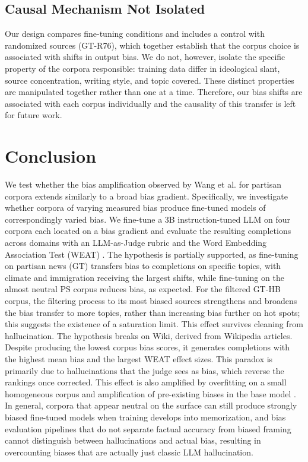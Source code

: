 \documentclass[12pt]{article}
\begin{document}
\subsection{Causal Mechanism Not Isolated}
Our design compares fine-tuning conditions and includes a control with randomized sources (GT-R76), which together establish that the corpus choice is associated with shifts in output bias. 
We do not, however, isolate the specific property of the corpora responsible: training data differ in ideological slant, source concentration, writing style, and topic covered. 
These distinct properties are manipulated together rather than one at a time.
Therefore, our bias shifts are associated with each corpus individually and the causality of this transfer is left for future work.
 
\section{Conclusion}
We test whether the bias amplification observed by Wang et al. \cite{wang2024bias} for partisan corpora extends similarly to a broad bias gradient. 
Specifically, we investigate whether corpora of varying measured bias produce fine-tuned models of correspondingly varied bias. 
We fine-tune a 3B instruction-tuned LLM on four corpora each located on a bias gradient and evaluate the resulting completions across domains with an LLM-as-Judge rubric and the Word Embedding Association Test (WEAT) \cite{caliskan2017}. 
The hypothesis is partially supported, as fine-tuning on partisan news (GT) transfers bias to completions on specific topics, with climate and immigration receiving the largest shifts, while fine-tuning on the almost neutral PS corpus reduces bias, as expected.
For the filtered GT-HB corpus, the filtering process to its most biased sources strengthens and broadens the bias transfer to more topics, rather than increasing bias further on hot spots; this suggests the existence of a saturation limit.
This effect survives cleaning from hallucination. 
The hypothesis breaks on Wiki, derived from Wikipedia articles. 
Despite producing the lowest corpus bias scores, it generates completions with the highest mean bias and the largest WEAT effect sizes.
This paradox is primarily due to hallucinations that the judge sees as bias, which reverse the rankings once corrected. 
This effect is also amplified by overfitting on a small homogeneous corpus and amplification of pre-existing biases in the base model \cite{wang2024bias}.
In general, corpora that appear neutral on the surface can still produce strongly biased fine-tuned models when training develops into memorization, and bias evaluation pipelines that do not separate factual accuracy from biased framing cannot distinguish between hallucinations and actual bias, resulting in overcounting biases that are actually just classic LLM hallucination. 
\end{document}
